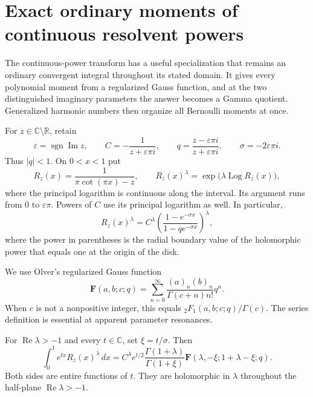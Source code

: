 \section{Exact ordinary moments of continuous resolvent powers}
\label{moment:sec}

The continuous-power transform has a useful specialization that remains
an ordinary convergent integral throughout its stated domain. It gives
every polynomial moment from a regularized Gauss function, and at the
two distinguished imaginary parameters the answer becomes a Gamma
quotient. Generalized harmonic numbers then organize all Bernoulli
moments at once.

For $z\in\mathbb C\setminus\mathbb R$, retain
\[
 \varepsilon=\operatorname{sgn}\operatorname{Im}z,\qquad
 C=-\frac1{z+\varepsilon\pi i},\qquad
 q=\frac{z-\varepsilon\pi i}{z+\varepsilon\pi i},\qquad
 \sigma=-2\varepsilon\pi i.
\]
Thus $|q|<1$. On $0<x<1$ put
\[
 R_z(x)=\frac1{\pi\cot(\pi x)-z},\qquad
 R_z(x)^\lambda=\exp\bigl(\lambda\operatorname{Log}R_z(x)\bigr),
\]
where the principal logarithm is continuous along the interval. Its
argument runs from $0$ to $\varepsilon\pi$. Powers of $C$ use its
principal logarithm as well. In particular,
\[
 R_z(x)^\lambda=C^\lambda
 \left(\frac{1-e^{-\sigma x}}{1-qe^{-\sigma x}}\right)^\lambda,
\]
where the power in parentheses is the radial boundary value of the
holomorphic power that equals one at the origin of the disk.

We use Olver's regularized Gauss function
\begin{equation}\label{moment:eq:regularized}
 \mathbf F(a,b;c;q)=
 \sum_{n=0}^\infty
 \frac{(a)_n(b)_n}{\Gamma(c+n)n!}q^n.
\end{equation}
When $c$ is not a nonpositive integer, this equals
${}_2F_1(a,b;c;q)/\Gamma(c)$. The series definition is essential at
apparent parameter resonances.

\begin{theorem}
\label{moment:thm:exponential}
For $\operatorname{Re}\lambda>-1$ and every $t\in\mathbb C$, set
$\xi=t/\sigma$. Then
\begin{equation}\label{moment:eq:exponential}
 \boxed{\displaystyle
 \int_0^1 e^{tx}R_z(x)^\lambda\,dx
 =C^\lambda e^{t/2}
   \frac{\Gamma(1+\lambda)}{\Gamma(1+\xi)}
   \mathbf F(\lambda,-\xi;1+\lambda-\xi;q).}
\end{equation}
Both sides are entire functions of $t$. They are holomorphic in
$\lambda$ throughout the half-plane $\operatorname{Re}\lambda>-1$.
\end{theorem}

